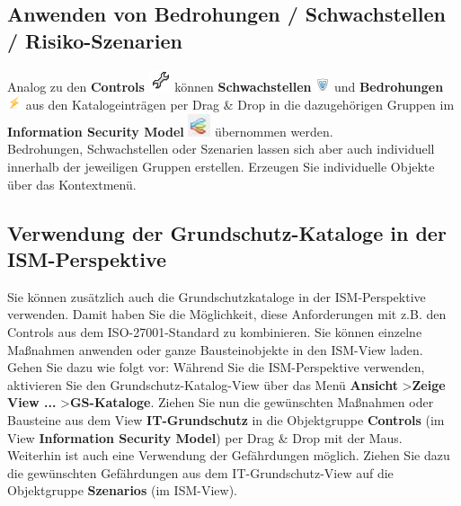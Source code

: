 \documentclass[a4paper,10pt]{book}
\begin{document}
\subsection{Anwenden von Bedrohungen / Schwachstellen / Risiko-Szenarien}
Analog zu den \textbf{Controls} \includegraphics[height=2ex]{Icon/Controls.png} können \textbf{Schwachstellen} \includegraphics[height=2ex]{Icon/Schwachstellen.png} und \textbf{Bedrohungen} \includegraphics[height=2ex]{Icon/Lightening.png} aus den
Katalogeinträgen per Drag \& Drop in die dazugehörigen Gruppen im \textbf{Information Security Model} \includegraphics[height=2ex]{Icon/Informationssicherheitsmodell.png} übernommen werden.
\newline\\
Bedrohungen, Schwachstellen oder Szenarien lassen sich aber auch individuell innerhalb der jeweiligen Gruppen erstellen. Erzeugen Sie individuelle Objekte über das Kontextmenü.

\subsection[Verwendung der Grundschutz-Kataloge \\ in der ISM-Perspektive]{Verwendung der Grundschutz-Kataloge in der ISM-Perspektive}
Sie können zusätzlich auch die Grundschutzkataloge in der ISM-Perspektive verwenden. Damit haben Sie die Möglichkeit, diese Anforderungen mit z.B.
den Controls aus dem ISO-27001-Standard zu kombinieren. Sie können einzelne Maßnahmen anwenden oder ganze Bausteinobjekte in den ISM-View laden.
\newline\\
Gehen Sie dazu wie folgt vor: Während Sie die ISM-Perspektive verwenden, aktivieren Sie den Grundschutz-Katalog-View über
das Menü \textbf{Ansicht} \textgreater \textbf{Zeige View ...} \textgreater \textbf{GS-Kataloge}. Ziehen Sie nun die gewünschten Maßnahmen oder Bausteine aus dem View
\textbf{IT-Grundschutz} in die Objektgruppe \textbf{Controls} (im View \textbf{Information Security Model}) per Drag \& Drop mit der Maus.
\newline\\
Weiterhin ist auch eine Verwendung der Gefährdungen möglich. Ziehen Sie dazu die gewünschten Gefährdungen aus dem
IT-Grundschutz-View auf die Objektgruppe \textbf{Szenarios} (im ISM-View).
\end{document}
